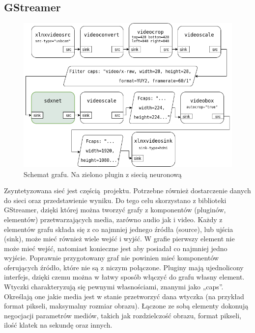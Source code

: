 \documentclass[12pt, oneside, a4paper]{article}
\begin{document}
\subsection{GStreamer}
\begin{figure}[h]
  \centering
  \includegraphics[scale=0.5625]{figures/pipeline.png}
  \caption{Schemat grafu. Na zielono plugin z siecią neuronową}\label{fig:pipeline}
\end{figure}
Zsyntetyzowana sieć jest częścią projektu. Potrzebne również dostarczenie
danych do sieci oraz przedstawienie wyniku.
Do tego celu skorzystano z biblioteki GStreamer, dzięki której można
tworzyć grafy z komponentów (pluginów, elementów)
przetwarzających media, zarówno audio jak i video.
Każdy z elementów grafu składa się z co najmniej jednego źródła (source),
lub ujścia (sink), może mieć również wiele wejść i wyjść. W grafie pierwszy
element nie może mieć wejść, natomiast konieczne jest aby posiadał co najmniej
jedno wyjście. Poprawnie przygotowany graf nie powinien mieć komponentów
oferujących źródło, które nie są z niczym połączone.
Pluginy mają ujednolicony interfejs, dzięki czemu można w łatwy sposób
włączyć do grafu własny element. Wtyczki charakteryzują się
pewnymi własnościami, znanymi jako „caps”. Określają one jakie 
media jest w stanie przetworzyć dana wtyczka (na przykład format pikseli,
maksymalny rozmiar obrazu). 
Łączone ze sobą elementy dokonują negocjacji
parametrów mediów, takich jak rozdzielczość obrazu, format pikseli,
ilość klatek na sekundę oraz innych.

\end{document}
